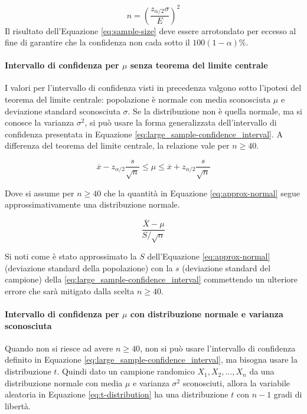 \documentclass{article}
\begin{document}
\begin{equation}
  n = \left(\displaystyle\frac{z_{\alpha/2} \sigma}{E}\right)^2
  \label{eq:sample-size}
\end{equation}
Il risultato dell'Equazione \ref{eq:sample-size} deve essere arrotondato per eccesso al 
fine di garantire che la confidenza non cada sotto il $100(1-\alpha)\%$.

\paragraph{Intervallo di confidenza per $\mu$ senza teorema del limite centrale}
I valori per l'intervallo di confidenza visti in precedenza valgono sotto l'ipotesi del 
teorema del limite centrale: popolazione è normale con media sconosciuta $\mu$ e deviazione 
standard sconosciuta $\sigma$. Se la distribuzione non è quella normale, ma si conosce la 
varianza $\sigma^2$, si può usare la forma generalizzata dell'intervallo di confidenza 
presentata in Equazione \ref{eq:large_sample-confidence_interval}. A differenza del teorema
del limite centrale, la relazione vale per $n \geq 40$.

\begin{equation}
  \overline{x} - z_{\alpha/2}\frac{s}{\sqrt{n}} \leq \mu \leq \overline{x} + z_{\alpha/2}\frac{s}{\sqrt{n}}
  \label{eq:large_sample-confidence_interval}
\end{equation}

Dove si assume per $n \geq 40$ che la quantità in Equazione \ref{eq:approx-normal} segue
approssimativamente una distribuzione normale.

\begin{equation}
  \displaystyle\frac{\overline{X} - \mu}{S/\sqrt{n}} 
  \label{eq:approx-normal}
\end{equation}

Si noti come è stato approssimato la $S$ dell'Equazione \ref{eq:approx-normal} (deviazione
standard della popolazione) con la $s$ (deviazione standard del campione) della 
\ref{eq:large_sample-confidence_interval} commettendo un ulteriore errore che sarà mitigato 
dalla scelta $n \geq 40$. 

\paragraph{Intervallo di confidenza per $\mu$ con distribuzione normale e varianza 
sconosciuta}
Quando non si riesce ad avere $n \geq 40$, non si può usare l'intervallo di confidenza
definito in Equazione \ref{eq:large_sample-confidence_interval}, ma bisogna usare la 
distribuzione $t$. Quindi dato un campione randomico $X_1, X_2, \dots, X_n$ da una 
distribuzione normale con media $\mu$ e varianza $\sigma^2$ sconosciuti, allora la 
variabile aleatoria in Equazione \ref{eq:t-distribution}  ha una distribuzione $t$ con $n-1$
gradi di libertà.
\end{document}
